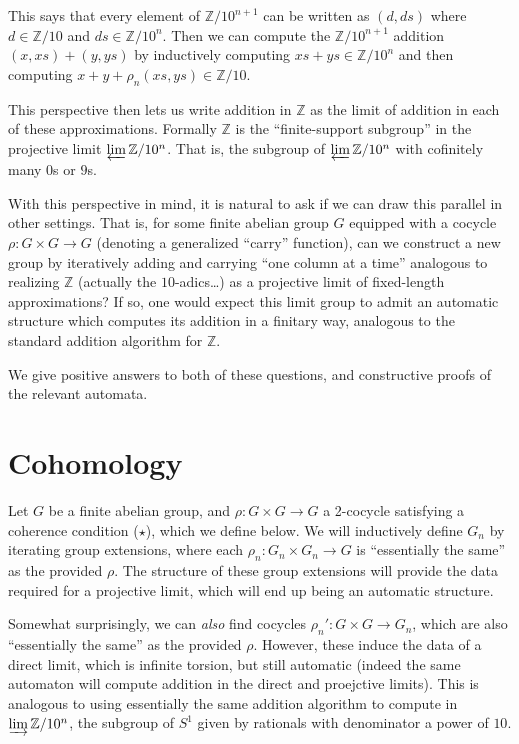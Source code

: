 \documentclass[12pt]{article}
\theoremstyle{definition}
\newcommand{\Z}{\mathbb{Z}}
\newcommand{\dirlim}{\varinjlim}
\renewcommand{\projlim}{\varprojlim}
\begin{document}
  This says that every element of $\Z / 10^{n+1}$ can be written as 
  $(d,ds)$ where $d \in \Z / 10$ and $ds \in \Z / 10^n$. 
  Then we can compute the $\Z / 10^{n+1}$ addition $(x,xs) + (y,ys)$ by 
  inductively computing $xs + ys \in \Z / 10^n$ and then computing 
  $x + y + \rho_n(xs,ys) \in \Z / 10$.

  This perspective then lets us write addition in $\Z$ as the limit of 
  addition in each of these approximations. Formally $\Z$ is the 
  ``finite-support subgroup'' in the projective limit $\projlim \Z / 10^n$.
  That is, the subgroup of $\projlim \Z / 10^n$ with cofinitely many $0$s
  or $9$s.

  \bigskip

  With this perspective in mind, it is natural to ask if we can draw this 
  parallel in other settings. That is, for some finite abelian group $G$
  equipped with a cocycle $\rho : G \times G \to G$ 
  (denoting a generalized ``carry'' function), can we construct a new group by 
  iteratively adding and carrying ``one column at a time'' analogous to
  realizing $\Z$ (actually the $10$-adics\ldots) as a projective limit of 
  fixed-length approximations? If so, one would expect this limit group to
  admit an automatic structure which computes its addition in a finitary way,
  analogous to the standard addition algorithm for $\Z$.

  We give positive answers to both of these questions, and constructive 
  proofs of the relevant automata.

  \section{Cohomology}
  Let $G$ be a finite abelian group, and $\rho : G \times G \to G$ a 
  2-cocycle satisfying a coherence condition ($\star$), which we define below. 
  We will inductively define $G_n$ by iterating group extensions,
  where each $\rho_n : G_n \times G_n \to G$ is ``essentially the same'' as
  the provided $\rho$. The structure of these group extensions will provide the
  data required for a projective limit, which will end up being an automatic
  structure. 
  
  Somewhat surprisingly, we can \emph{also} find cocycles 
  $\rho_n' : G \times G \to G_n$, which are also ``essentially the same'' as
  the provided $\rho$. However, these induce the data of a direct limit,
  which is infinite torsion, but still automatic 
  (indeed the same automaton will compute addition in the direct and 
  proejctive limits). This is analogous to using essentially the same addition
  algorithm to compute in $\dirlim \Z / 10^n$, the subgroup of $S^1$ given by
  rationals with denominator a power of $10$.
\end{document}
